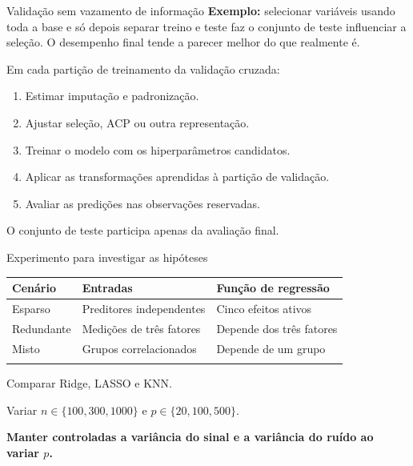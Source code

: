 \documentclass[
  10pt,
  ignorenonframetext,
  aspectratio=169,
  brazilian,
]{beamer}
\newcounter{none} %
\providecommand{\tightlist}{%
  \setlength{\itemsep}{0pt}\setlength{\parskip}{0pt}}
\begin{document}
\begin{frame}{Validação sem vazamento de informação}
\protect{}\label{validauxe7uxe3o-sem-vazamento-de-informauxe7uxe3o}
\textbf{Exemplo:} selecionar variáveis usando toda a base e só depois
separar treino e teste faz o conjunto de teste influenciar a seleção. O
desempenho final tende a parecer melhor do que realmente é.

Em cada partição de treinamento da validação cruzada:

\begin{enumerate}
\tightlist
\item
  Estimar imputação e padronização.
\item
  Ajustar seleção, ACP ou outra representação.
\item
  Treinar o modelo com os hiperparâmetros candidatos.
\item
  Aplicar as transformações aprendidas à partição de validação.
\item
  Avaliar as predições nas observações reservadas.
\end{enumerate}

O conjunto de teste participa apenas da avaliação final.

\end{frame}

\begin{frame}{Experimento para investigar as hipóteses}
\protect{}\label{experimento-para-investigar-as-hipuxf3teses}
{\def\LTcaptype{none} %
\begin{longtable}[]{@{}lll@{}}
\toprule\noalign{}
Cenário & Entradas & Função de regressão \\
\midrule\noalign{}
\endhead
Esparso & Preditores independentes & Cinco efeitos ativos \\
Redundante & Medições de três fatores & Depende dos três fatores \\
Misto & Grupos correlacionados & Depende de um grupo \\
\bottomrule\noalign{}
\end{longtable}
}

Comparar Ridge, LASSO e KNN.

Variar \(n\in\{100,300,1000\}\) e \(p\in\{20,100,500\}\).

\textbf{Manter controladas a variância do sinal e a variância do ruído
ao variar \(p\).}

\end{frame}
\end{document}
